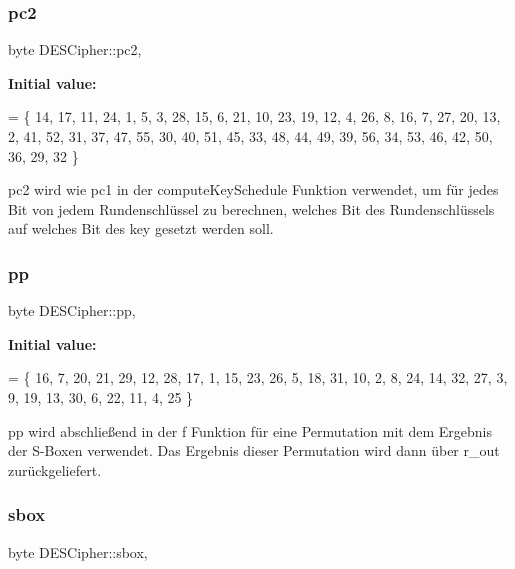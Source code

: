 \subsubsection{\texorpdfstring{pc2}{pc2}}
{\footnotesize\ttfamily byte D\+E\+S\+Cipher\+::pc2\hspace{0.3cm}{\ttfamily [static]}, {\ttfamily [private]}}

{\bfseries Initial value\+:}
\begin{DoxyCode}
= \{
        14, 17, 11, 24, 1, 5,
        3, 28, 15, 6, 21, 10,
        23, 19, 12, 4, 26, 8,
        16, 7, 27, 20, 13, 2,
        41, 52, 31, 37, 47, 55,
        30, 40, 51, 45, 33, 48,
        44, 49, 39, 56, 34, 53,
        46, 42, 50, 36, 29, 32
\}
\end{DoxyCode}
pc2 wird wie pc1 in der compute\+Key\+Schedule Funktion verwendet, um für jedes Bit von jedem Rundenschlüssel zu berechnen, welches Bit des Rundenschlüssels auf welches Bit des key gesetzt werden soll. \mbox{\label{classDESCipher_af44d8fee3816aeefffd2049697a177cc}} 
\subsubsection{\texorpdfstring{pp}{pp}}
{\footnotesize\ttfamily byte D\+E\+S\+Cipher\+::pp\hspace{0.3cm}{\ttfamily [static]}, {\ttfamily [private]}}

{\bfseries Initial value\+:}
\begin{DoxyCode}
= \{
        16, 7, 20, 21,
        29, 12, 28, 17,
        1, 15, 23, 26,
        5, 18, 31, 10,
        2, 8, 24, 14,
        32, 27, 3, 9,
        19, 13, 30, 6,
        22, 11, 4, 25
\}
\end{DoxyCode}
pp wird abschließend in der f Funktion für eine Permutation mit dem Ergebnis der S-\/\+Boxen verwendet. Das Ergebnis dieser Permutation wird dann über r\+\_\+out zurückgeliefert. \mbox{\label{classDESCipher_af65a5877e08227f4f1817cc6c49dd9bb}} 
\subsubsection{\texorpdfstring{sbox}{sbox}}
{\footnotesize\ttfamily byte D\+E\+S\+Cipher\+::sbox\hspace{0.3cm}{\ttfamily [static]}, {\ttfamily [private]}}

